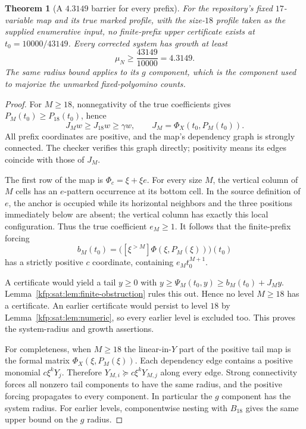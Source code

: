 \documentclass[11pt,a4paper]{article}
\newtheorem{theorem}{Theorem}[section]
\theoremstyle{definition}
\theoremstyle{remark}
\begin{document}
\begin{theorem}[A $4.3149$ barrier for every prefix]\label{kfp:sat:thm:bui}
For the repository's fixed $17$-variable map and its true marked profile,
with the size-$18$ profile taken as the supplied enumerative input, no
finite-prefix upper certificate exists at $t_0=10000/43149$.
Every corrected system has growth at least
\begin{equation}\label{kfp:sat:eq:bui-wall}
 \mu_N\ge\frac{43149}{10000}=4.3149.
\end{equation}
The same radius bound applies to its $g$ component, which is the component
used to majorize the unmarked fixed-polyomino counts.
\end{theorem}
\begin{proof}
For $M\ge18$, nonnegativity of the true coefficients gives
$P_M(t_0)\ge P_{18}(t_0)$, hence
\[
 J_Mw\ge J_{18}w\ge\gamma w,
 \qquad J_M=\Phi_X(t_0,P_M(t_0)).
\]
All prefix coordinates are positive, and the map's dependency graph is
strongly connected. The checker verifies this graph directly; positivity
means its edges coincide with those of $J_M$.

The first row of the map is $\Phi_c=\xi+\xi e$. For every size $M$, the
vertical column of $M$ cells has an $e$-pattern occurrence at its bottom
cell. In the source definition of $e$, the anchor is occupied while its
horizontal neighbors and the three positions immediately below are absent;
the vertical column has exactly this local configuration. Thus the true
coefficient $e_M\ge1$. It follows that the finite-prefix forcing
\[
 b_M(t_0)=\bigl([\xi^{>M}]\Phi(\xi,P_M(\xi))\bigr)(t_0)
\]
has a strictly positive $c$ coordinate, containing $e_Mt_0^{M+1}$.

A certificate would yield a tail $y\ge0$ with
$y\ge\Psi_M(t_0,y)\ge b_M(t_0)+J_My$.
Lemma~\ref{kfp:sat:lem:finite-obstruction} rules this out. Hence no level
$M\ge18$ has a certificate. An earlier certificate would persist to level
$18$ by Lemma~\ref{kfp:sat:lem:numeric}, so every earlier level is excluded too.
This proves the system-radius and growth assertions.

For completeness, when $M\ge18$ the linear-in-$Y$ part of the positive
tail map is the formal matrix $\Phi_X(\xi,P_M(\xi))$. Each dependency
edge contains a positive monomial $c\xi^kY_j$. Therefore
$Y_{M,i}\succeq c\xi^kY_{M,j}$ along every edge. Strong connectivity
forces all nonzero tail components to have the same radius, and the
positive forcing propagates to every component. In particular the $g$
component has the system radius. For earlier levels, componentwise
nesting with $B_{18}$ gives the same upper bound on the $g$ radius.
\end{proof}
\end{document}
